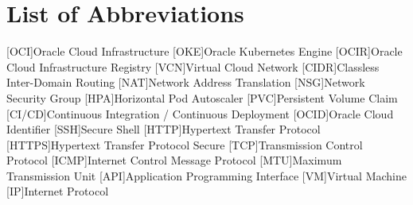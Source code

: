 \cleardoublepage
{}
\tableofcontents
\clearpage

\cleardoublepage
{}
{}
\chapter*{List of Abbreviations}
\begin{acronym}[\hspace{3cm}]
  [OCI]{Oracle Cloud Infrastructure}
  [OKE]{Oracle Kubernetes Engine}
  [OCIR]{Oracle Cloud Infrastructure Registry}
  [VCN]{Virtual Cloud Network}
  [CIDR]{Classless Inter-Domain Routing}
  [NAT]{Network Address Translation}
  [NSG]{Network Security Group}
  [HPA]{Horizontal Pod Autoscaler}
  [PVC]{Persistent Volume Claim}
  [CI/CD]{Continuous Integration / Continuous Deployment}
  [OCID]{Oracle Cloud Identifier}
  [SSH]{Secure Shell}
  [HTTP]{Hypertext Transfer Protocol}
  [HTTPS]{Hypertext Transfer Protocol Secure}
  [TCP]{Transmission Control Protocol}
  [ICMP]{Internet Control Message Protocol}
  [MTU]{Maximum Transmission Unit}
  [API]{Application Programming Interface}
  [VM]{Virtual Machine}
  [IP]{Internet Protocol}
\end{acronym}
\clearpage

\cleardoublepage
{}
{}
\listoffigures
\clearpage

\cleardoublepage
{}
{}
\listoftables
\clearpage
